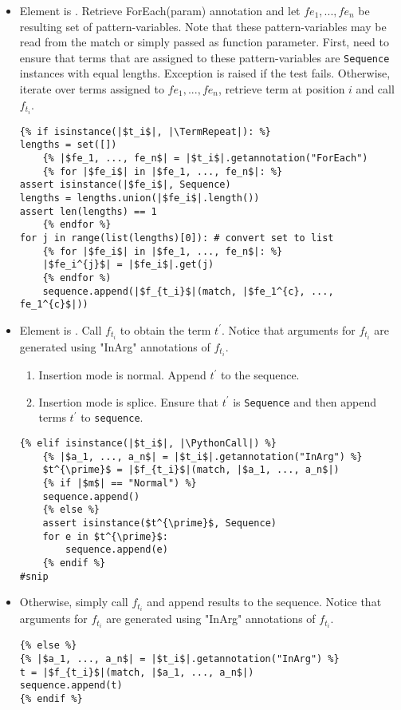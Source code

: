 \begin{itemize}
\item
Element is \TermRepeat.  Retrieve ForEach(param) annotation and let $fe_1, ..., fe_n$ be resulting set of pattern-variables. Note that these pattern-variables may be read from the match or simply passed as function parameter. First, need to ensure that terms that are assigned to these pattern-variables are \texttt{Sequence} instances with equal lengths. Exception is raised if the test fails. Otherwise, iterate over terms assigned to $fe_1, ..., fe_n$, retrieve term at position $i$ and call $f_{t_i}$.

\begin{verbatim}
{% if isinstance(|$t_i$|, |\TermRepeat|): %}
lengths = set([])
	{% |$fe_1, ..., fe_n$| = |$t_i$|.getannotation("ForEach")
	{% for |$fe_i$| in |$fe_1, ..., fe_n$|: %}
assert isinstance(|$fe_i$|, Sequence)
lengths = lengths.union(|$fe_i$|.length())
assert len(lengths) == 1
	{% endfor %}
for j in range(list(lengths)[0]): # convert set to list 
	{% for |$fe_i$| in |$fe_1, ..., fe_n$|: %}
	|$fe_i^{j}$| = |$fe_i$|.get(j)
	{% endfor %)
	sequence.append(|$f_{t_i}$|(match, |$fe_1^{c}, ..., fe_1^{c}$|))
\end{verbatim}
\item
Element is \PythonCall. Call $f_{t_i}$  to obtain the term $t^{\prime}$. Notice that arguments for $f_{t_i}$ are generated using "InArg" annotations of $f_{t_i}$. 
	\begin{enumerate}
	\item Insertion mode is normal. Append $t^{\prime}$ to the sequence.
	\item Insertion mode is splice. Ensure that $t^{\prime}$ is \texttt{Sequence} and then append terms $t^{\prime}$ to \texttt{sequence}.
	\end{enumerate}

\begin{verbatim}
{% elif isinstance(|$t_i$|, |\PythonCall|) %}
	{% |$a_1, ..., a_n$| = |$t_i$|.getannotation("InArg") %}
	$t^{\prime}$ = |$f_{t_i}$|(match, |$a_1, ..., a_n$|)
	{% if |$m$| == "Normal") %}
	sequence.append()
	{% else %}
	assert isinstance($t^{\prime}$, Sequence)
	for e in $t^{\prime}$:
		sequence.append(e)
	{% endif %}
#snip
\end{verbatim}

\item Otherwise, simply call $f_{t_i}$ and append results to the sequence. Notice that arguments for $f_{t_i}$ are generated using "InArg" annotations of $f_{t_i}$. 

\begin{verbatim}
{% else %}
{% |$a_1, ..., a_n$| = |$t_i$|.getannotation("InArg") %}
t = |$f_{t_i}$|(match, |$a_1, ..., a_n$|)
sequence.append(t)
{% endif %}
\end{verbatim}
\end{itemize}

